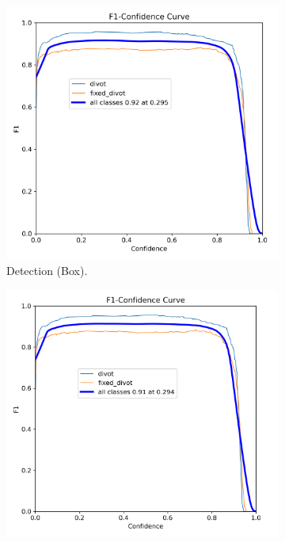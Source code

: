 \begin{figure}[h!]
    \centering
    \begin{subfigure}[b]{0.49\textwidth}
        \centering
        \includegraphics[width=\textwidth]{figures/BoxF1_curve.png} 
        \caption{Detection (Box).} %
        \label{fig:box_f1_appendix}
    \end{subfigure}
    \hfill 
    \begin{subfigure}[b]{0.49\textwidth}
        \centering
        \includegraphics[width=\textwidth]{figures/MaskF1_curve.png} 

\end{subfigure}
\end{figure}
